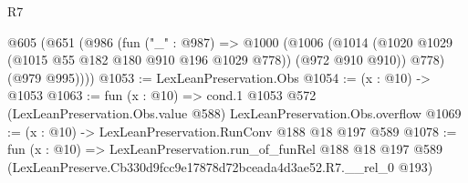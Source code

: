 \begin{lexlean}{R7}
\begin{coremodule}
  @605
    (@651
      (@986
        (fun ("_" : @987) =>
        @1000
          (@1006
            (@1014 (@1020 @1029 (@1015 @55 @182 @180 @910 @196 @1029 @778)) (@972 @910 @910))
            @778)
          (@979 @995))))
@1053 := LexLeanPreservation.Obs
@1054 := (x : @10) -> @1053
@1063 := fun (x : @10) =>
  cond.{1} @1053 @572 (LexLeanPreservation.Obs.value @588) LexLeanPreservation.Obs.overflow
@1069 := (x : @10) -> LexLeanPreservation.RunConv @188 @18 @197 @589
@1078 := fun (x : @10) =>
  LexLeanPreservation.run_of_funRel
    @188
    @18
    @197
    @589
    (LexLeanPreserve.Cb330d9fcc9e17878d72bceada4d3ae52.R7.__rel_0 @193)
\end{coremodule}
\end{lexlean}
